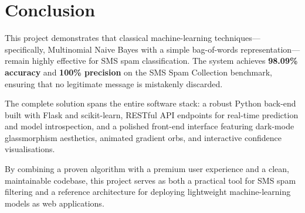 \documentclass[paper=a4, fontsize=11pt]{scrartcl}
\numberwithin{equation}{section}
\numberwithin{figure}{section}
\numberwithin{table}{section}
\begin{document}
\section{Conclusion}
This project demonstrates that classical machine-learning techniques—specifically, Multinomial Naive Bayes with a simple bag-of-words representation—remain highly effective for SMS spam classification.  The system achieves \textbf{98.09\% accuracy} and \textbf{100\% precision} on the SMS Spam Collection benchmark, ensuring that no legitimate message is mistakenly discarded.

The complete solution spans the entire software stack: a robust Python back-end built with Flask and scikit-learn, RESTful API endpoints for real-time prediction and model introspection, and a polished front-end interface featuring dark-mode glassmorphism aesthetics, animated gradient orbs, and interactive confidence visualisations.

By combining a proven algorithm with a premium user experience and a clean, maintainable codebase, this project serves as both a practical tool for SMS spam filtering and a reference architecture for deploying lightweight machine-learning models as web applications.

\vspace{0.3cm}
\end{document}
